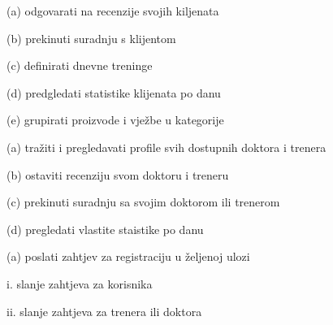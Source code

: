 \begin{packed_enum}
\begin{packed_enum}
				\end{packed_enum}
			
				\item  {}
				
				\begin{packed_enum}
					
					\item (a) odgovarati na recenzije svojih kiljenata
					\item (b) prekinuti suradnju s klijentom
					\item (c) definirati dnevne treninge
					\item (d) predgledati statistike klijenata po danu
					\item (e) grupirati proizvode i vježbe u kategorije
					
				\end{packed_enum}
			
				\item  {}
				
				\begin{packed_enum}
					
					\item (a) tražiti i pregledavati profile svih dostupnih doktora i trenera
					\item (b) ostaviti recenziju svom doktoru i treneru
					\item (c) prekinuti suradnju sa svojim doktorom ili trenerom
					\item (d) pregledati vlastite staistike po danu
					
				\end{packed_enum}
			
				\item  {}
				
				\begin{packed_enum}
					
					\item (a) poslati zahtjev za registraciju u željenoj ulozi
					
					\begin{packed_enum}
						
						\item i. slanje zahtjeva za korisnika 
						\item ii. slanje zahtjeva za trenera ili doktora
						
					\end{packed_enum}
					

\end{packed_enum}
\end{packed_enum}
